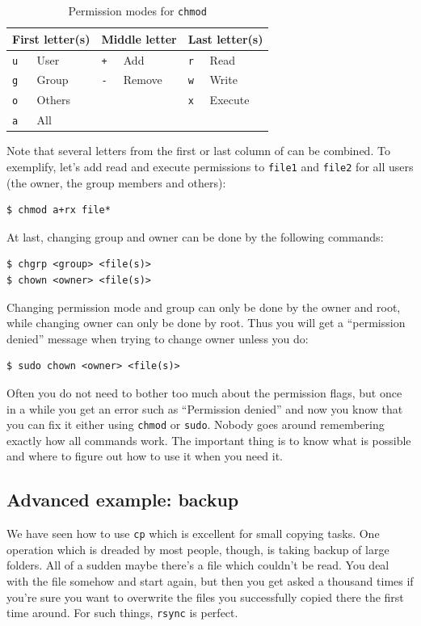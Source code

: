 \begin{table}
	\centering
	\caption{Permission modes for \texttt{chmod}}
	\begin{tabular}{ll|ll|ll}
	\hline
	\multicolumn{2}{c}{First letter(s)} & \multicolumn{2}{|c|}{Middle letter}  & \multicolumn{2}{c}{Last letter(s)}  \\
	\hline
	\verb|u|		&	User		& \verb|+|	& Add		& \verb|r|	& Read		\\
	\verb|g|		&	Group	& \verb|-|	& Remove		& \verb|w|	& Write		\\
	\verb|o|		&	Others	& 			&			& \verb|x|	& Execute	\\
	\verb|a|		&	All		&			&			&			&
	\end{tabular}
	\label{tab:bash:chmod}
\end{table}

Note that several letters from the first or last column of  can be combined. To exemplify, let's add read and execute permissions to \verb|file1| and \verb|file2| for all users (the owner, the group members and others):

\begin{verbatim}
$ chmod a+rx file*
\end{verbatim}

At last, changing group and owner can be done by the following commands:

\begin{verbatim}
$ chgrp <group> <file(s)>
$ chown <owner> <file(s)>
\end{verbatim}
Changing permission mode and group can only be done by the owner and root, while changing owner can only be done by root. Thus you will get a ``permission denied'' message when trying to change owner unless you do:

\begin{verbatim}
$ sudo chown <owner> <file(s)>
\end{verbatim}

Often you do not need to bother too much about the permission flags, but once in a while you get an error such as ``Permission denied'' and now you know that you can fix it either using \verb|chmod| or \verb|sudo|. Nobody goes around remembering exactly how all commands work. The important thing is to know what is possible and where to figure out how to use it when you need it.

\subsection{Advanced example: backup}
We have seen how to use \verb|cp| which is excellent for small copying tasks. One operation which is dreaded by most people, though, is taking backup of large folders. All of a sudden maybe there's a file which couldn't be read. You deal with the file somehow and start again, but then you get asked a thousand times if you're sure you want to overwrite the files you successfully copied there the first time around. For such things, \verb|rsync| is perfect.

